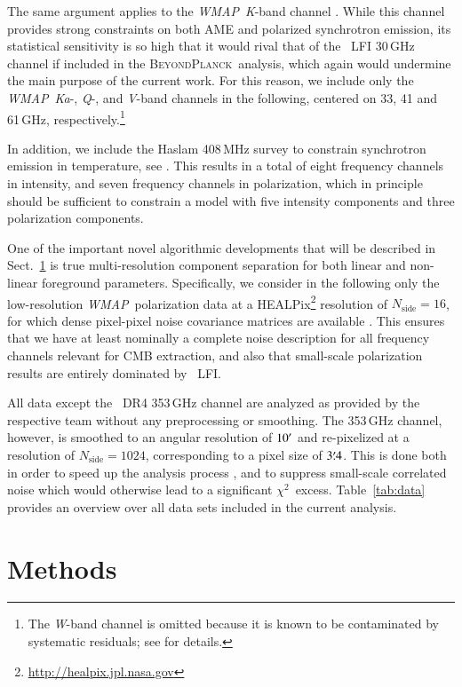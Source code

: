 \documentclass[twocolumn]{aa}
\def\WMAP{\textit{WMAP}}
\def\chisq{$\chi^2$}
\newcommand{\BP}{\textsc{BeyondPlanck}}
\newcommand{\?}[1]{\textcolor{red}{{\bf [#1]}}}
\begin{document}
The same argument applies to the \WMAP\ \textit K-band channel
\citep{bennett2012}. While this channel provides strong constraints on both AME
and polarized synchrotron emission, its statistical sensitivity is so high that
it would rival that of the \Planck\ LFI 30\,GHz channel if included in the \BP\
analysis, which again would undermine the main purpose of the current work. For
this reason, we include only the \WMAP\ \textit{Ka}-, \textit Q-, and \textit
V-band channels in the following, centered on 33, 41 and 61\,GHz, respectively.\footnote{The \textit W-band channel is omitted because it is known to be contaminated by
systematic residuals; see \citet{bennett2012,bp17} for details.}

In addition, we include the Haslam 408\,MHz survey to constrain synchrotron
emission in temperature, see \citet{bp13}. This results in a total of eight frequency channels in
intensity, and seven frequency channels in polarization, which in
principle should be sufficient to constrain a model with five intensity
components and three polarization components.

One of the important novel algorithmic developments that will be described in
Sect.~\ref{sec:methods} is true multi-resolution component separation for both
linear and non-linear foreground parameters. Specifically, we consider in the
following only the low-resolution \WMAP\ polarization data at a
HEALPix\footnote{\url{http://healpix.jpl.nasa.gov}} \citep{gorski2005}
resolution of $N_{\mathrm{side}}=16$, for which dense pixel-pixel noise
covariance matrices are available \citep{bennett2012}. This ensures that we have
at least nominally a complete noise description for all frequency channels
relevant for CMB extraction, and also that small-scale polarization results are
entirely dominated by \Planck\ LFI.

All data except the \Planck\ DR4 353\,GHz channel are analyzed as provided
by the respective team without any preprocessing or smoothing. The
353\,GHz channel, however, is smoothed to an angular resolution of
$10\arcm$ and re-pixelized at a resolution of
$N_{\mathrm{side}}=1024$, corresponding to a pixel size of
$3\overset{\prime}{.}4$. This is done both in order to speed up the analysis
process \citep{bp01,bp03}, and to suppress small-scale correlated
noise which would otherwise lead to a significant
\chisq\ excess. Table~\ref{tab:data} provides an overview over all
data sets included in the current analysis.

\section{Methods}
\label{sec:methods}
\end{document}
